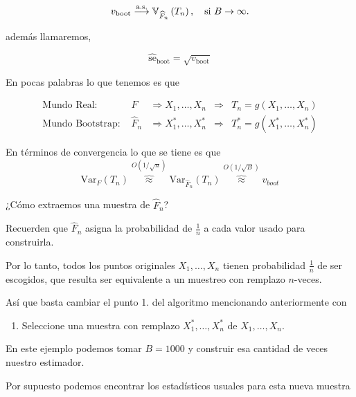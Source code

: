 \documentclass[12pt]{book}\usepackage[]{graphicx}\usepackage[]{color}
\theoremstyle{definition}
\theoremstyle{plain}
\begin{document}
\begin{equation}
v_{\mathrm{boot}} \stackrel{\mathrm{a.s.}}{\longrightarrow} \mathbb{V}_{\widehat{F}_{n}}\left(T_{n}\right), \text {\quad si } B \rightarrow \infty.
\end{equation}

además llamaremos,

\begin{equation*}
\widehat{\mathrm{se}}_{\mathrm{boot}}=\sqrt{v_{\mathrm{boot}}}
\end{equation*}

En pocas palabras lo que tenemos es que


\begin{align*}
\text  {Mundo Real: }
& F
& \Longrightarrow  X_{1}, \ldots, X_{n}
& \Longrightarrow
& T_{n} = g\left(X_{1}, \ldots, X_{n}\right) \\
\text {Mundo Bootstrap: }
& \widehat{F}_{n}
& \Longrightarrow  X_{1}^{*}, \ldots, X_{n}^{*}
& \Longrightarrow
& T_{n}^{*}=g\left(X_{1}^{*}, \ldots, X_{n}^{*}\right)
\end{align*}

En términos de convergencia lo que se tiene es que
\[
\mathrm{Var}_{F}\left(T_{n}\right) \overbrace{\approx}^{O(1 / \sqrt{n})} \mathrm{Var}_{\widehat{F}_{n}}\left(T_{n}\right) \overbrace{\approx}^{O(1 / \sqrt{B})} v_{b o o t}
\]

\begin{pregunta}{}{}
    ¿Cómo extraemos una muestra de \(\hat{F}_n\)?
\end{pregunta}


Recuerden que \(\hat{F}_{n}\) asigna la probabilidad de \(\frac{1}{n}\) a cada valor usado para construirla.

Por lo tanto, todos los puntos originales \(X_{1},\ldots,X_{n}\) tienen probabilidad \(\frac{1}{n}\) de ser escogidos, que resulta ser equivalente a un muestreo con remplazo \(n\)-veces.

 Así que basta cambiar el punto 1. del algoritmo mencionando anteriormente con

\begin{enumerate}
        \item Seleccione una muestra con remplazo  \(X_{1}^{*}, \ldots, X_{n}^{*}\) de  \(X_{1},\ldots,X_{n}\).
\end{enumerate}

\begin{laboratorio}{}{}
   En este ejemplo podemos tomar \(B=1000\) y construir esa cantidad de veces nuestro estimador.





   Por supuesto podemos encontrar los estadísticos usuales para esta nueva muestra






\end{laboratorio}
\end{document}
